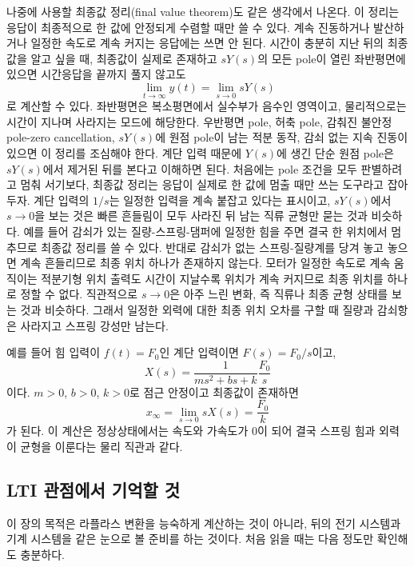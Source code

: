 나중에 사용할 최종값 정리(final value theorem)도 같은 생각에서 나온다.
이 정리는 응답이 최종적으로 한 값에 안정되게 수렴할 때만 쓸 수 있다.
계속 진동하거나 발산하거나 일정한 속도로 계속 커지는 응답에는 쓰면 안 된다.
시간이 충분히 지난 뒤의 최종값을 알고 싶을 때, 최종값이 실제로 존재하고 $sY(s)$의 모든 pole이 열린 좌반평면에 있으면 시간응답을 끝까지 풀지 않고도
\begin{equation}
  \lim_{t\to\infty} y(t)
  =
  \lim_{s\to 0} sY(s)
\end{equation}
로 계산할 수 있다.
좌반평면은 복소평면에서 실수부가 음수인 영역이고, 물리적으로는 시간이 지나며 사라지는 모드에 해당한다.
우반평면 pole, 허축 pole, 감춰진 불안정 pole-zero cancellation, $sY(s)$에 원점 pole이 남는 적분 동작, 감쇠 없는 지속 진동이 있으면 이 정리를 조심해야 한다.
계단 입력 때문에 $Y(s)$에 생긴 단순 원점 pole은 $sY(s)$에서 제거된 뒤를 본다고 이해하면 된다.
처음에는 pole 조건을 모두 판별하려고 멈춰 서기보다, 최종값 정리는 응답이 실제로 한 값에 멈출 때만 쓰는 도구라고 잡아 두자.
계단 입력의 $1/s$는 일정한 입력을 계속 붙잡고 있다는 표시이고, $sY(s)$에서 $s\to0$을 보는 것은 빠른 흔들림이 모두 사라진 뒤 남는 직류 균형만 묻는 것과 비슷하다.
예를 들어 감쇠가 있는 질량-스프링-댐퍼에 일정한 힘을 주면 결국 한 위치에서 멈추므로 최종값 정리를 쓸 수 있다.
반대로 감쇠가 없는 스프링-질량계를 당겨 놓고 놓으면 계속 흔들리므로 최종 위치 하나가 존재하지 않는다.
모터가 일정한 속도로 계속 움직이는 적분기형 위치 출력도 시간이 지날수록 위치가 계속 커지므로 최종 위치를 하나로 정할 수 없다.
직관적으로 $s\to 0$은 아주 느린 변화, 즉 직류나 최종 균형 상태를 보는 것과 비슷하다.
그래서 일정한 외력에 대한 최종 위치 오차를 구할 때 질량과 감쇠항은 사라지고 스프링 강성만 남는다.

예를 들어 힘 입력이 $f(t)=F_0$인 계단 입력이면 $F(s)=F_0/s$이고,
\begin{equation}
  X(s)=\frac{1}{ms^2+bs+k}\frac{F_0}{s}
\end{equation}
이다.
$m>0$, $b>0$, $k>0$로 점근 안정이고 최종값이 존재하면
\begin{equation}
  x_\infty
  =
  \lim_{s\to0}sX(s)
  =
  \frac{F_0}{k}
\end{equation}
가 된다.
이 계산은 정상상태에서는 속도와 가속도가 0이 되어 결국 스프링 힘과 외력이 균형을 이룬다는 물리 직관과 같다.

\subsection{LTI 관점에서 기억할 것}

이 장의 목적은 라플라스 변환을 능숙하게 계산하는 것이 아니라, 뒤의 전기 시스템과 기계 시스템을 같은 눈으로 볼 준비를 하는 것이다.
처음 읽을 때는 다음 정도만 확인해도 충분하다.

